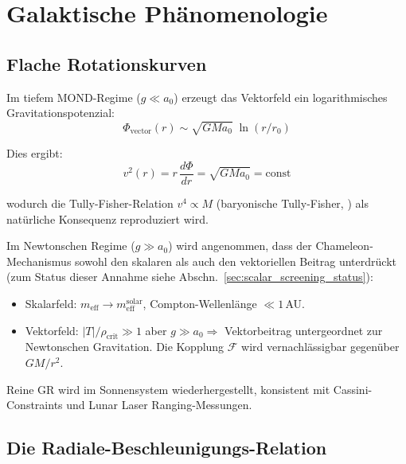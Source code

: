 \documentclass[aps,prd,twocolumn,superscriptaddress,nofootinbib]{revtex4-2}
\begin{document}
\section{Galaktische Ph\"anomenologie}
\label{sec:phenomenology}
\subsection{Flache Rotationskurven}
\label{sec:rotation_curves}

Im tiefem MOND-Regime ($g \ll a_0$) erzeugt das Vektorfeld ein logarithmisches Gravitationspotenzial:
\begin{equation}
\Phi_{\mathrm{vector}}(r) \sim \sqrt{G M a_0}\;\ln(r/r_0)
\label{eq:log_potential}
\end{equation}

Dies ergibt:
\begin{equation}
v^2(r) = r\,\frac{d\Phi}{dr} = \sqrt{G M a_0} = \mathrm{const}
\end{equation}

wodurch die Tully-Fisher-Relation $v^4 \propto M$ (baryonische Tully-Fisher, \cite{McGaugh2012}) als nat\"urliche Konsequenz reproduziert wird.

Im Newtonschen Regime ($g \gg a_0$) wird angenommen, dass der Chameleon-Mechanismus sowohl den skalaren als auch den vektoriellen Beitrag unterdr\"uckt (zum Status dieser Annahme siehe Abschn.~\ref{sec:scalar_screening_status}):
\begin{itemize}
\item Skalarfeld: $m_{\mathrm{eff}} \to m_{\mathrm{eff}}^{\mathrm{solar}}$, Compton-Wellenl\"ange $\ll 1$\,AU.
\item Vektorfeld: $|T|/\rho_{\mathrm{crit}} \gg 1$ aber $g \gg a_0 \Rightarrow$ Vektorbeitrag untergeordnet zur Newtonschen Gravitation. Die Kopplung $\mathcal{F}$ wird vernachl\"assigbar gegen\"uber $GM/r^2$.
\end{itemize}

Reine GR wird im Sonnensystem wiederhergestellt, konsistent mit Cassini-Constraints \cite{Bertotti2003} und Lunar Laser Ranging-Messungen.

\subsection{Die Radiale-Beschleunigungs-Relation}
\label{sec:rar}
\end{document}
